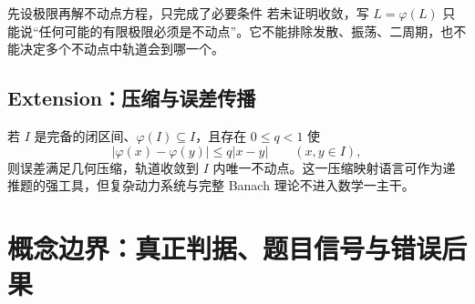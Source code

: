 \documentclass[11pt,a4paper]{ctexart}
\begin{document}
\begin{warnbox}{先设极限再解不动点方程，只完成了必要条件}
若未证明收敛，写 $L=\varphi(L)$ 只能说“任何可能的有限极限必须是不动点”。它不能排除发散、振荡、二周期，也不能决定多个不动点中轨道会到哪一个。
\end{warnbox}

\subsection{Extension：压缩与误差传播}

若 $I$ 是完备的闭区间、$\varphi(I)\subseteq I$，且存在 $0\le q<1$ 使
\[
|\varphi(x)-\varphi(y)|\le q|x-y|\qquad(x,y\in I),
\]
则误差满足几何压缩，轨道收敛到 $I$ 内唯一不动点。这一压缩映射语言可作为递推题的强工具，但复杂动力系统与完整 Banach 理论不进入数学一主干。

\section{概念边界：真正判据、题目信号与错误后果}
\end{document}
